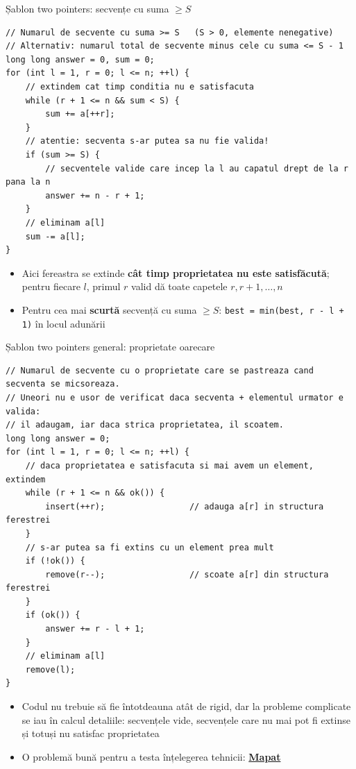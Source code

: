 \documentclass[8pt,mathserif]{beamer}
\begin{document}
\begin{frame}[fragile]{Șablon two pointers: secvențe cu suma $\ge S$}
  \begin{lstlisting}
// Numarul de secvente cu suma >= S   (S > 0, elemente nenegative)
// Alternativ: numarul total de secvente minus cele cu suma <= S - 1
long long answer = 0, sum = 0;
for (int l = 1, r = 0; l <= n; ++l) {
    // extindem cat timp conditia nu e satisfacuta
    while (r + 1 <= n && sum < S) {
        sum += a[++r];
    }
    // atentie: secventa s-ar putea sa nu fie valida!
    if (sum >= S) {
        // secventele valide care incep la l au capatul drept de la r pana la n
        answer += n - r + 1;
    }
    // eliminam a[l]
    sum -= a[l];
}
  \end{lstlisting}
  \begin{itemize}
    \item Aici fereastra se extinde \textbf{cât timp proprietatea nu este satisfăcută}; pentru fiecare $l$, primul $r$ valid dă toate capetele $r, r+1, \dots, n$
    \item Pentru cea mai \textbf{scurtă} secvență cu suma $\ge S$: \texttt{best = min(best, r - l + 1)} în locul adunării
  \end{itemize}
\end{frame}

\begin{frame}[fragile]{Șablon two pointers general: proprietate oarecare}
  \begin{lstlisting}
// Numarul de secvente cu o proprietate care se pastreaza cand secventa se micsoreaza.
// Uneori nu e usor de verificat daca secventa + elementul urmator e valida:
// il adaugam, iar daca strica proprietatea, il scoatem.
long long answer = 0;
for (int l = 1, r = 0; l <= n; ++l) {
    // daca proprietatea e satisfacuta si mai avem un element, extindem
    while (r + 1 <= n && ok()) {
        insert(++r);                 // adauga a[r] in structura ferestrei
    }
    // s-ar putea sa fi extins cu un element prea mult
    if (!ok()) {
        remove(r--);                 // scoate a[r] din structura ferestrei
    }
    if (ok()) {
        answer += r - l + 1;
    }
    // eliminam a[l]
    remove(l);
}
  \end{lstlisting}
  \begin{itemize}
    \item Codul nu trebuie să fie întotdeauna atât de rigid, dar la probleme complicate se iau în calcul detaliile: secvențele vide, secvențele care nu mai pot fi extinse și totuși nu satisfac proprietatea
    \item O problemă bună pentru a testa înțelegerea tehnicii: \href{https://kilonova.ro/problems/4262}{\textbf{Mapat}} 
  \end{itemize}
\end{frame}
\end{document}
